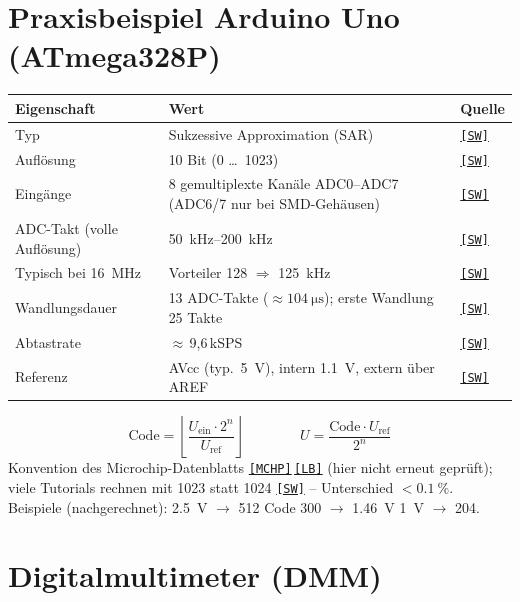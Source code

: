 \documentclass[11pt,a4paper]{article}
\newcommand{\q}[1]{\hyperlink{src:#1}{\textcolor{quelle}{\texttt{\footnotesize[#1]}}}}
\begin{document}
\section{Praxisbeispiel Arduino Uno (ATmega328P)}\label{sec:arduino}
\begin{tabularx}{\textwidth}{@{}lXl@{}}
\toprule
Eigenschaft & Wert & Quelle\\ \midrule
Typ & Sukzessive Approximation (SAR) & \q{SW}\\
Auflösung & 10 Bit (0 \dots\ 1023) & \q{SW}\\
Eingänge & 8 gemultiplexte Kanäle ADC0--ADC7 (ADC6/7 nur bei SMD-Gehäusen) & \q{SW}\\
ADC-Takt (volle Auflösung) & \SIrange{50}{200}{\kilo\hertz} & \q{SW}\\
Typisch bei \SI{16}{\mega\hertz} & Vorteiler 128 $\Rightarrow$ \SI{125}{\kilo\hertz} & \q{SW}\\
Wandlungsdauer & 13 ADC-Takte ($\approx\SI{104}{\micro\second}$); erste Wandlung 25 Takte & \q{SW}\\
Abtastrate & $\approx$\,9,6\,kSPS & \q{SW}\\
Referenz & AVcc (typ.\ \SI{5}{\volt}), intern \SI{1.1}{\volt}, extern über AREF & \q{SW}\\
\bottomrule
\end{tabularx}
\begin{equation}\label{f:code}
\text{Code}=\left\lfloor\frac{U_\text{ein}\cdot 2^n}{U_\text{ref}}\right\rfloor
\qquad\qquad U=\frac{\text{Code}\cdot U_\text{ref}}{2^n}
\end{equation}
Konvention des Microchip-Datenblatts \q{MCHP}\,\q{LB} (hier nicht erneut geprüft); viele Tutorials rechnen mit 1023 statt 1024 \q{SW} -- Unterschied $<\SI{0.1}{\percent}$.\\
Beispiele (nachgerechnet): \SI{2.5}{\volt} $\to$ 512 \quad\textbar\quad Code 300 $\to$ \SI{1.46}{\volt} \quad\textbar\quad \SI{1}{\volt} $\to$ 204.

\section{Digitalmultimeter (DMM)}\label{sec:dmm}
\end{document}
